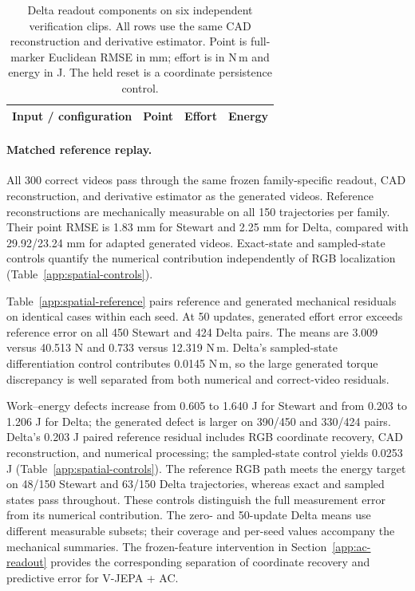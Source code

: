 \documentclass[10pt,twocolumn,letterpaper]{article}
\begin{document}
\begin{table}[t]
\caption{Delta readout components on six independent verification clips. All rows use the same CAD reconstruction and derivative estimator. Point is full-marker Euclidean RMSE in mm; effort is in N\,m and energy in J. The held reset is a coordinate persistence control.}
\label{app:delta-components}
\centering\small
\setlength{\tabcolsep}{3pt}
\begin{tabular}{lrrr}
\toprule
Input / configuration & Point & Effort & Energy\\
\midrule

\bottomrule
\end{tabular}
\end{table}

\paragraph{Matched reference replay.}
All 300 correct videos pass through the same frozen family-specific readout, CAD reconstruction, and derivative estimator as the generated videos. Reference reconstructions are mechanically measurable on all 150 trajectories per family. Their point RMSE is 1.83 mm for Stewart and 2.25 mm for Delta, compared with 29.92/23.24 mm for adapted generated videos. Exact-state and sampled-state controls quantify the numerical contribution independently of RGB localization (Table~\ref{app:spatial-controls}).

Table~\ref{app:spatial-reference} pairs reference and generated mechanical residuals on identical cases within each seed. At 50 updates, generated effort error exceeds reference error on all 450 Stewart and 424 Delta pairs. The means are 3.009 versus 40.513 N and 0.733 versus 12.319 N\,m. Delta's sampled-state differentiation control contributes 0.0145 N\,m, so the large generated torque discrepancy is well separated from both numerical and correct-video residuals.

Work--energy defects increase from 0.605 to 1.640 J for Stewart and from 0.203 to 1.206 J for Delta; the generated defect is larger on 390/450 and 330/424 pairs. Delta's 0.203 J paired reference residual includes RGB coordinate recovery, CAD reconstruction, and numerical processing; the sampled-state control yields 0.0253 J (Table~\ref{app:spatial-controls}). The reference RGB path meets the energy target on 48/150 Stewart and 63/150 Delta trajectories, whereas exact and sampled states pass throughout. These controls distinguish the full measurement error from its numerical contribution. The zero- and 50-update Delta means use different measurable subsets; their coverage and per-seed values accompany the mechanical summaries. The frozen-feature intervention in Section~\ref{app:ac-readout} provides the corresponding separation of coordinate recovery and predictive error for V-JEPA + AC.
\end{document}
